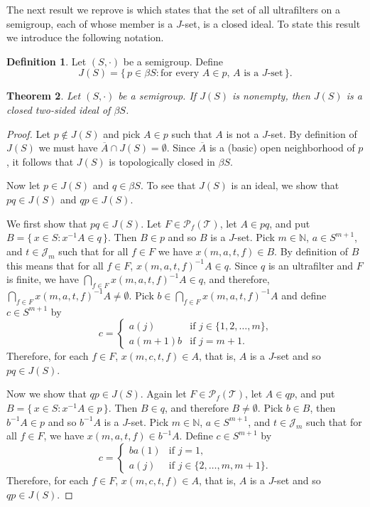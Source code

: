 \documentclass[12pt,showtrims]{memoir}
\theoremstyle{plain}
\newtheorem{thm}{Theorem}[section]
\theoremstyle{definition}
\newtheorem{defn}[thm]{Definition}
\newcommand{\bbN}{\mathbb{N}}
\newcommand{\calJ}{\mathcal{J}}
\newcommand{\calT}{\mathcal{T}}
\newcommand{\Pf}{\mathcal{P}_f}
\begin{document}
The next result we reprove is \cite[Theorem 3.4]{De:2008uq} which states that the set of all ultrafilters on a semigroup, each of whose member is a $J$-set, is a closed ideal.
To state this result we introduce the following notation.

\begin{defn}
  Let $(S, \cdot)$ be a semigroup. 
  Define
  \[
    J(S) = \{\, p \in \beta S : \mbox{for every $A \in p$, $A$ is a $J$-set} \,\}.
  \]
\end{defn}

\begin{thm}
  Let $(S, \cdot)$ be a semigroup.
  If $J(S)$ is nonempty, then $J(S)$ is a closed two-sided ideal of $\beta S$.
\end{thm}
\begin{proof}
  Let $p \not\in J(S)$ and pick $A \in p$ such that $A$ is not a $J$-set.
  By definition of $J(S)$ we must have $\overline{A} \cap J(S) = \emptyset$.
  Since $\overline{A}$ is a (basic) open neighborhood of $p$, it follows that $J(S)$ is topologically closed in $\beta S$.

  Now let $p \in J(S)$ and $q \in \beta S$.
  To see that $J(S)$ is an ideal, we show that $pq \in J(S)$ and $qp \in J(S)$. 

  We first show that $pq \in J(S)$.
  Let $F \in \Pf(\calT)$, let $A \in pq$, and put $B = \{\, x \in S : x^{-1}A \in q \,\}$.
  Then $B \in p$ and so $B$ is a $J$-set.
  Pick $m \in \bbN$, $a \in S^{m+1}$, and $t \in \calJ_m$ such that for all $f \in F$ we have $x(m, a, t, f) \in B$.
  By definition of $B$ this means that for all $f \in F$, $x(m, a, t, f)^{-1}A \in q$. 
  Since $q$ is an ultrafilter and $F$ is finite, we have $\bigcap_{f \in F} x(m, a, t, f)^{-1}A \in q$, and therefore, $\bigcap_{f \in F} x(m, a, t, f)^{-1}A \ne \emptyset$.
  Pick $b \in \bigcap_{f \in F} x(m, a, t, f)^{-1}A$ and define $c \in S^{m+1}$ by
  \[
    c =
    \begin{cases}
      a(j) & \mbox{if $j \in \{1, 2, \ldots, m\}$,} \\
      a(m+1)b & \mbox{if $j = m+1$.}
    \end{cases}
  \]
  Therefore, for each $f \in F$, $x(m, c, t, f) \in A$, that is, $A$ is a $J$-set and so $pq \in J(S)$.

  Now we show that $qp \in J(S)$.
  Again let $F \in \Pf(\calT)$, let $A \in qp$, and put $B = \{\, x \in S : x^{-1}A \in p \,\}$.
  Then $B \in q$, and therefore $B \ne \emptyset$.
  Pick $b \in B$, then $b^{-1}A \in p$ and so $b^{-1}A$ is a $J$-set.
  Pick $m \in \bbN$, $a \in S^{m+1}$, and $t \in \calJ_m$ such that for all $f \in F$, we have $x(m, a, t, f) \in b^{-1}A$.
  Define $c \in S^{m+1}$ by
  \[
    c =
    \begin{cases}
      ba(1) & \mbox{if $j =1$,} \\
      a(j) & \mbox{if $j \in \{2, \ldots, m, m+1\}$.}
    \end{cases}
  \]
  Therefore, for each $f \in F$, $x(m, c, t, f) \in A$, that is, $A$ is a $J$-set and so $qp \in J(S)$.
\end{proof}
\end{document}
